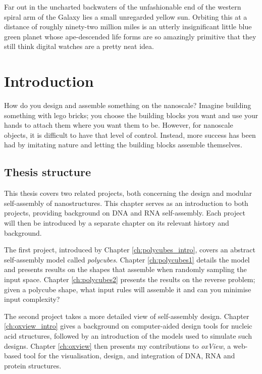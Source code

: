\begin{savequote}[8cm]
Far out in the uncharted backwaters of the unfashionable end of the western spiral arm of the Galaxy lies a small unregarded yellow sun. Orbiting this at a distance of roughly ninety-two million miles is an utterly insignificant little blue green planet whose ape-descended life forms are so amazingly primitive that they still think digital watches are a pretty neat idea.
\end{savequote}

\chapter{Introduction}\label{ch:1-intro}

\minitoc

How do you design and assemble something on the nanoscale? Imagine building something with lego bricks; you choose the building blocks you want and use your hands to attach them where you want them to be. However, for nanoscale objects, it is difficult to have that level of control. Instead, more success has been had by imitating nature and letting the building blocks assemble themselves.

\section{Thesis structure}
This thesis covers two related projects, both concerning the design and modular self-assembly of nanostructures. This chapter serves as an introduction to both projects, providing background on DNA and RNA self-assembly. Each project will then be introduced by a separate chapter on its relevant history and background.

The first project, introduced by Chapter \ref{ch:polycubes_intro}, covers an abstract self-assembly model called \emph{polycubes}. Chapter \ref{ch:polycubes1} details the model and presents results on the shapes that assemble when randomly sampling the input space. Chapter \ref{ch:polycubes2} presents the results on the reverse problem; given a polycube shape, what input rules will assemble it and can you minimise input complexity?

The second project takes a more detailed view of self-assembly design. Chapter \ref{ch:oxview_intro} gives a background on computer-aided design tools for nucleic acid structures, followed by an introduction of the models used to simulate such designs. Chapter \ref{ch:oxview} then presents my contributions to \emph{oxView}, a web-based tool for the visualisation, design, and integration of DNA, RNA and protein structures.


